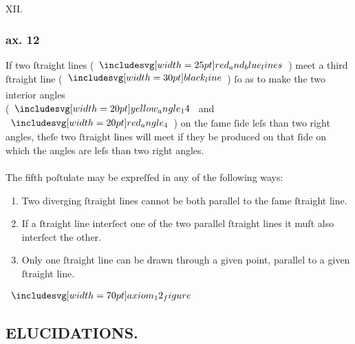 \begin{center}
  XII.\label{ax12}\\
  \hfill
\end{center}
\begin{minipage}{0.67\textwidth}
  \subsubsection{ax. 12}
  \begin{center}
    \raggedright If two ſtraight lines (\hspace{-1ex}$\img{red_and_blue_lines}$\hspace{-1ex}) meet a third ſtraight line (\hspace{-1ex}$\blackline$\hspace{-1ex}) ſo as to make the two interior angles\\ (\hspace{-1ex}$\img[0][0][20]{yellow_angle_14}$ and $\img[0][0][20]{red_angle_4}$\hspace{-1ex}) on the ſame ſide leſs than two right angles, theſe two ſtraight lines will meet if they be produced on that ſide on which the angles are leſs than two right angles.\\
    \hfill\\
    The fifth poſtulate may be expreſſed in any of the following ways:\\
    \begin{enumerate}
      \item Two diverging ſtraight lines cannot be both parallel to the ſame ſtraight line.
      \item If a ſtraight line interſect one of the two parallel ſtraight lines it muſt also interſect the other.
      \item Only one ſtraight line can be drawn through a given point, parallel to a given ſtraight line.
    \end{enumerate}
  \end{center}
\end{minipage}%
\begin{minipage}{0.33\textwidth}
  \begin{center}
    $\img[0][0][70]{axiom_12_figure}$
  \end{center}
\end{minipage}

\pagebreak

\begin{center}
  \subsection[Elucidations]{\centering \scshape{\LARGE{ELUCIDATIONS.}}}
  \label{subsec:elucidations}
\end{center}

